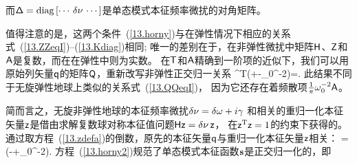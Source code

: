 {{而$\mbox{${\sf \Delta}$}={\rm diag}\,[\cdots\,\delta\nu\,\cdots]$是单态模式本征频率微扰的对角矩阵。

值得注意的是，这两个条件~(\ref{13.horny})与在弹性情况下相应的关系式~(\ref{13.ZZeqI})--(\ref{13.Kdiag})相同;
唯一的差别在于，在非弹性微扰中矩阵$\mbox{${\sf H}$}$、$\mbox{${\sf Z}$}$和$\mbox{${\sf A}$}$是复数，而在在弹性中则为实数。
在$\mbox{${\sf T}$}$和$\mbox{${\sf A}$}$精确到一阶项的近似下，我们可以用原始列矢量$\mbox{${\sf q}$}$的矩阵$\mbox{${\sf Q}$}$，重新改写非弹性正交归一关系
\eq \label{13.horny2}
\ssQ^{\rm T}(\ssI+\ssT-\invpi\om_0^{-2}\ssA)\ssQ=\ssI.
\en
此结果不同于无旋弹性地球上类似的关系式~(\ref{13.QQeqI})，
因为它还存在着频散项$\mbox{$\frac{1}{\pi}$}\mbox{$\omega$}_0^{-2}\mbox{${\sf A}$}$。

简而言之，无旋非弹性地球的本征频率微扰$\delta\nu=\delta\mbox{$\omega$}+i\gamma$
和相关的重归一化本征矢量$\mbox{${\sf z}$}$是借由求解复数球对称本征值问题$\mbox{${\sf H}$}\mbox{${\sf z}$}=\delta\nu\,\mbox{${\sf z}$}$，
在$\mbox{${\sf z}$}^{\rm T}\mbox{${\sf z}$}=1$的约束下获得的。
通过取方程~(\ref{13.zdefa})的倒数，原先的本征矢量$\mbox{${\sf q}$}$与重归一化本征矢量$\mbox{${\sf z}$}$相关：
\eq
\ssq=(\ssI-\half\ssT+\invtwopi\om_0^{-2}\ssA)\ssz.
\en
方程~(\ref{13.horny2})规范了单态模式本征函数$\mbox{${\bf s}$}$是正交归一化的，即
\eqa \label{13.anorm1}
}}

